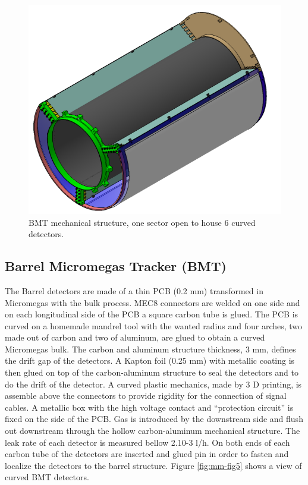 \begin{figure}[htb]
 \includegraphics[width=1.0\columnwidth,keepaspectratio]{images/fig3}
 \caption{BMT mechanical structure, one sector open to house 6 curved detectors.}
 \label{fig:mm-fig3}
\end{figure}


\subsection{Barrel Micromegas Tracker (BMT)}

The Barrel detectors are made of a thin PCB (0.2 mm) transformed in Micromegas with the bulk process. MEC8 connectors 
are welded on one side and on each longitudinal side of the PCB a square carbon tube is glued. The PCB is curved on a 
homemade mandrel tool with the wanted radius and four arches, two made out of carbon and two of aluminum, are glued to 
obtain a curved Micromegas bulk. The carbon and aluminum structure thickness, 3 mm, defines the drift gap of the 
detectors. A Kapton foil (0.25 mm) with metallic coating is then glued on top of the carbon-aluminum structure to seal 
the detectors and to do the drift of the detector. A curved plastic mechanics, made by 3 D printing, is assemble above 
the connectors to provide rigidity for the connection of signal cables. A metallic box with the high voltage contact 
and “protection circuit” is fixed on the side of the PCB.  Gas is introduced by the downstream side and flush out 
downstream through the hollow carbon-aluminum mechanical structure. The leak rate of each detector is measured bellow 
2.10-3 l/h.  On both ends of each carbon tube of the detectors are inserted and glued pin in order to fasten and 
localize the detectors to the barrel structure. Figure \ref{fig:mm-fig5} shows a view of curved BMT detectors.

